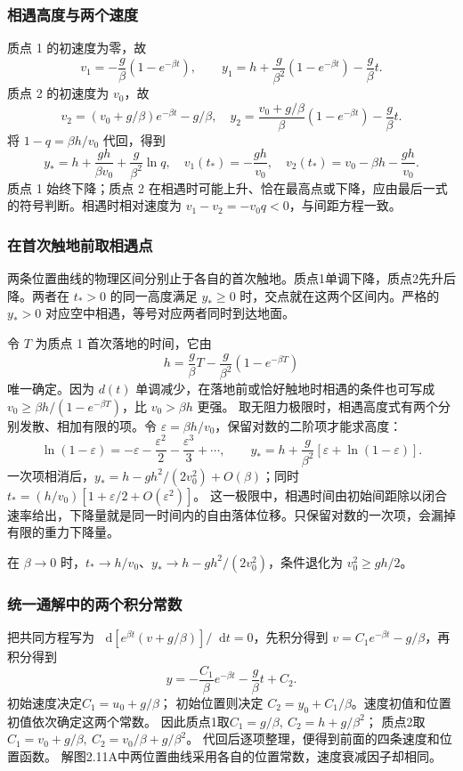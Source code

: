 \documentclass[UTF8,fontset=fandol,a4paper,11pt]{ctexart}
\newcommand{\dd}{\mathop{}\!\mathrm{d}}
\begin{document}
\subsubsection*{相遇高度与两个速度}
质点 1 的初速度为零，故
\[
v_1=-\frac g\beta(1-e^{-\beta t}),\qquad
y_1=h+\frac g{\beta^2}(1-e^{-\beta t})-\frac g\beta t.
\]
质点 2 的初速度为 $v_0$，故
\[
v_2=(v_0+g/\beta)e^{-\beta t}-g/\beta,
\quad y_2=\frac{v_0+g/\beta}{\beta}(1-e^{-\beta t})-\frac g\beta t.
\]
将 $1-q=\beta h/v_0$ 代回，得到
\[
\boxed{y_*=h+\frac{gh}{\beta v_0}+\frac g{\beta^2}\ln q},
\quad\boxed{v_1(t_*)=-\frac{gh}{v_0}},
\quad\boxed{v_2(t_*)=v_0-\beta h-\frac{gh}{v_0}}.
\]
质点 1 始终下降；质点 2 在相遇时可能上升、恰在最高点或下降，应由最后一式的符号判断。相遇时相对速度为 $v_1-v_2=-v_0q<0$，与间距方程一致。

\subsubsection*{在首次触地前取相遇点}
两条位置曲线的物理区间分别止于各自的首次触地。质点1单调下降，质点2先升后降。两者在 $t_*>0$ 的同一高度满足 $\boxed{y_*\geq0}$ 时，交点就在这两个区间内。严格的 $y_*>0$ 对应空中相遇，等号对应两者同时到达地面。

令 $T$ 为质点 1 首次落地的时间，它由
\[
h=\frac g\beta T-\frac g{\beta^2}(1-e^{-\beta T})
\]
唯一确定。因为 $d(t)$ 单调减少，在落地前或恰好触地时相遇的条件也可写成 $v_0\geq\beta h/(1-e^{-\beta T})$，比 $v_0>\beta h$ 更强。
取无阻力极限时，相遇高度式有两个分别发散、相加有限的项。令
$\varepsilon=\beta h/v_0$，保留对数的二阶项才能求高度：
\[
\ln(1-\varepsilon)=-\varepsilon-\frac{\varepsilon^2}{2}
-\frac{\varepsilon^3}{3}+\cdots,
\qquad
y_*=h+\frac g{\beta^2}
[\varepsilon+\ln(1-\varepsilon)].
\]
一次项相消后，$y_*=h-gh^2/(2v_0^2)+O(\beta)$；同时
$t_*=(h/v_0)[1+\varepsilon/2+O(\varepsilon^2)]$。
这一极限中，相遇时间由初始间距除以闭合速率给出，下降量就是同一时间内的自由落体位移。只保留对数的一次项，会漏掉有限的重力下降量。

在 $\beta\to0$ 时，$t_*\to h/v_0$、$y_*\to h-gh^2/(2v_0^2)$，条件退化为 $v_0^2\geq gh/2$。
\subsubsection*{统一通解中的两个积分常数}
把共同方程写为
$\dd[e^{\beta t}(v+g/\beta)]/\dd t=0$，先积分得到
$v=C_1e^{-\beta t}-g/\beta$，再积分得到
\[
y=-\frac{C_1}{\beta}e^{-\beta t}-\frac g\beta t+C_2.
\]
初始速度决定$C_1=u_0+g/\beta$；
初始位置则决定 $C_2=y_0+C_1/\beta$。速度初值和位置初值依次确定这两个常数。
因此质点1取$C_1=g/\beta,\ C_2=h+g/\beta^2$；
质点2取$C_1=v_0+g/\beta,\ C_2=v_0/\beta+g/\beta^2$。
代回后逐项整理，便得到前面的四条速度和位置函数。
解图2.11A中两位置曲线采用各自的位置常数，速度衰减因子却相同。
\end{document}
